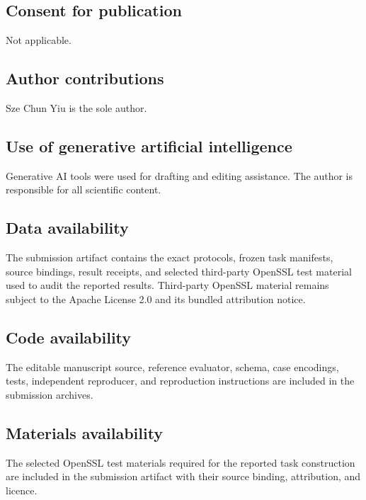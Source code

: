 \documentclass[pdflatex,sn-mathphys-num]{sn-jnl}
\begin{document}
\subsection{Consent for publication}\label{consent-for-publication}

Not applicable.

\subsection{Author contributions}\label{author-contributions}

Sze Chun Yiu is the sole author.

\subsection{Use of generative artificial intelligence}\label{use-of-generative-artificial-intelligence}

Generative AI tools were used for drafting and editing assistance. The author is responsible for all scientific content.

\subsection{Data availability}\label{data-availability}

The submission artifact contains the exact protocols, frozen task manifests, source bindings, result receipts, and selected third-party OpenSSL test material used to audit the reported results. Third-party OpenSSL material remains subject to the Apache License 2.0 and its bundled attribution notice.

\subsection{Code availability}\label{code-availability}

The editable manuscript source, reference evaluator, schema, case encodings, tests, independent reproducer, and reproduction instructions are included in the submission archives.

\subsection{Materials availability}\label{materials-availability}

The selected OpenSSL test materials required for the reported task construction are included in the submission artifact with their source binding, attribution, and licence.


\end{document}
